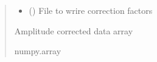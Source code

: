 \documentclass[letterpaper,10pt,english]{sphinxmanual}
\begin{document}
\begin{fulllineitems}
\begin{quote}
\begin{description}
\begin{itemize}
\item {} 
\sphinxAtStartPar
{} () \textendash{} File to wrire correction factors

\end{itemize}

\item[{Returns}] \leavevmode
\sphinxAtStartPar
Amplitude corrected data array

\item[{Return type}] \leavevmode
\sphinxAtStartPar
numpy.array

\end{description}\end{quote}

\end{fulllineitems}

\end{document}
